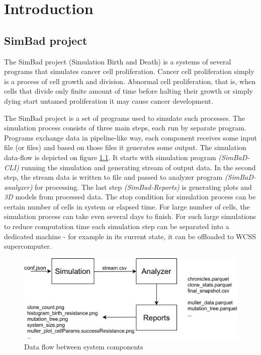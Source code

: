 \chapter{Introduction}
\label{chapter:1}
\section{SimBad project}
The SimBad project (Simulation Birth and Death) is a systems of several programs that simulates cancer cell proliferation. Cancer cell proliferation simply is a  process of cell growth and division. Abnormal cell proliferation, that is, when  cells that divide only finite amount of time before halting their growth or simply dying start untamed proliferation it may cause cancer development.

The SimBad project is a set of programs used to simulate such processes. The simulation process consists of three main steps, each run by separate program. Programs exchange data in pipeline-like way, each component receives some input file (or files) and based on those files it generates some output. The simulation data-flow is depicted on figure \ref{fig:data-flow}. It starts with simulation program \textit{(SimBaD-CLI)} running the simulation and generating stream of output data. In the second step, the stream data is written to file and passed to analyzer program \textit{(SimBaD-analyzer)} for processing. The last step \textit{(SimBad-Reports)} is generating plots and \textit{3D} models from processed data.
The stop condition for simulation process can be certain number of cells in system or elapsed time. For large number of cells, the simulation process can take even several days to finish. For such large simulations to reduce computation time each simulation step can be separated into a dedicated machine - for example in its current state, it can be offloaded to WCSS supercomputer. 
\begin{figure}[h!]
	\centering
		\includegraphics[width=0.9\linewidth]{diagrams/simbad-data-flow.png}
	\caption{Data flow between system components}
	\label{fig:data-flow}
\end{figure}
